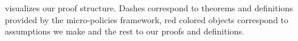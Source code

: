  visualizes our proof structure.
Dashes correspond to theorems and definitions provided by
the micro-policies framework, red colored objects correspond
to assumptions we make and the rest to our proofs and definitions.








